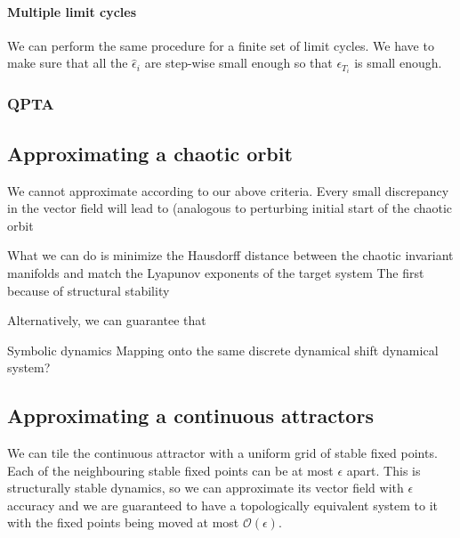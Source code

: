 \documentclass{article}
\theoremstyle{definition}
\theoremstyle{remark}
\begin{document}





\paragraph{Multiple limit cycles}
We can perform the same procedure for a finite set of limit cycles.
We have to make sure that all the $\hat{\epsilon}_i$ are step-wise small enough so that $\epsilon_{T_i}$ is small enough. 


\subsubsection{QPTA}%
\citep{Park2023a}


\subsection{Approximating a chaotic orbit}
We cannot approximate according to our above criteria.
Every small discrepancy in the vector field will lead to 
(analogous to perturbing initial start of the chaotic orbit 


What we can do is minimize the Hausdorff distance between the chaotic invariant manifolds and match the Lyapunov exponents of the target system
The first because of structural stability

Alternatively, we can guarantee that 


Symbolic dynamics
Mapping onto the same discrete dynamical shift dynamical system?



\subsection{Approximating a continuous attractors}

We can tile the continuous attractor with a uniform grid of stable fixed points.
Each of the neighbouring stable fixed points can be at most $\epsilon$ apart.
This is structurally stable dynamics, so we can approximate its vector field with $\epsilon$ accuracy and we are guaranteed to have a topologically equivalent system to it with the fixed points being moved at most $\mathcal{O}(\epsilon)$.
\end{document}
